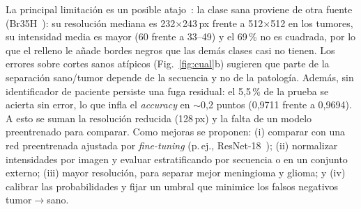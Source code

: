\documentclass[letterpaper, 10 pt, conference]{ieeeconf}  %
\begin{document}
La principal limitación es un posible atajo~\cite{c8}: la clase sana proviene de otra fuente (Br35H~\cite{c10}): su resolución mediana es 232$\times$243\,px frente a 512$\times$512 en los tumores, su intensidad media es mayor (60 frente a 33--49) y el 69\,\% no es cuadrada, por lo que el relleno le añade bordes negros que las demás clases casi no tienen. Los errores sobre cortes sanos atípicos (Fig.~\ref{fig:cual}b) sugieren que parte de la separación sano/tumor depende de la secuencia y no de la patología. Además, sin identificador de paciente persiste una fuga residual: el 5,5\,\% de la prueba se acierta sin error, lo que infla el \textit{accuracy} en $\sim$0,2 puntos (0,9711 frente a 0,9694). A esto se suman la resolución reducida (128\,px) y la falta de un modelo preentrenado para comparar. Como mejoras se proponen: (i) comparar con una red preentrenada ajustada por \textit{fine-tuning} (p.\,ej., ResNet-18~\cite{c4}); (ii) normalizar intensidades por imagen y evaluar estratificando por secuencia o en un conjunto externo; (iii) mayor resolución, para separar mejor meningioma y glioma; y (iv) calibrar las probabilidades y fijar un umbral que minimice los falsos negativos tumor$\rightarrow$sano.
\end{document}
